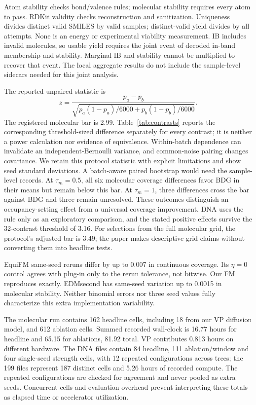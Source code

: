 \documentclass{article}
\begin{document}
Atom stability checks bond/valence rules; molecular stability requires every atom to pass. RDKit validity checks reconstruction and sanitization. Uniqueness divides distinct valid SMILES by valid samples; distinct-valid yield divides by all attempts. None is an energy or experimental viability measurement. IB includes invalid molecules, so usable yield requires the joint event of decoded in-band membership and stability. Marginal IB and stability cannot be multiplied to recover that event. The local aggregate results do not include the sample-level sidecars needed for this joint analysis.

The reported unpaired statistic is
\[
 z=\frac{p_a-p_b}{\sqrt{p_a(1-p_a)/6000+p_b(1-p_b)/6000}}.
\]
The registered molecular bar is 2.99. Table~\ref{tab:contrasts} reports the corresponding threshold-sized difference separately for every contrast; it is neither a power calculation nor evidence of equivalence. Within-batch dependence can invalidate an independent-Bernoulli variance, and common-noise pairing changes covariance. We retain this protocol statistic with explicit limitations and show seed standard deviations. A batch-aware paired bootstrap would need the sample-level records. At $\tau_m=0.5$, all six molecular coverage differences favor BDG in their means but remain below this bar. At $\tau_m=1$, three differences cross the bar against BDG and three remain unresolved. These outcomes distinguish an occupancy-setting effect from a universal coverage improvement. DNA uses the rule only as an exploratory comparison, and the stated positive effects survive the 32-contrast threshold of 3.16. For selections from the full molecular grid, the protocol's adjusted bar is 3.49; the paper makes descriptive grid claims without converting them into headline tests.

EquiFM same-seed reruns differ by up to 0.007 in continuous coverage. Its $\eta=0$ control agrees with plug-in only to the rerun tolerance, not bitwise. Our FM reproduces exactly. EDMsecond has same-seed variation up to 0.0015 in molecular stability. Neither binomial errors nor three seed values fully characterize this extra implementation variability.

The molecular run contains 162 headline cells, including 18 from our VP diffusion model, and 612 ablation cells. Summed recorded wall-clock is 16.77 hours for headline and 65.15 for ablations, 81.92 total. VP contributes 0.813 hours on different hardware. The DNA files contain 84 headline, 111 ablation/window and four single-seed strength cells, with 12 repeated configurations across trees; the 199 files represent 187 distinct cells and 5.26 hours of recorded compute. The repeated configurations are checked for agreement and never pooled as extra seeds. Concurrent cells and evaluation overhead prevent interpreting these totals as elapsed time or accelerator utilization.
\end{document}
